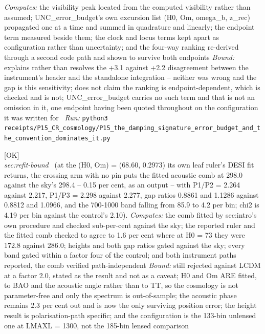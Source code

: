 \begin{description}
\emph{Computes:} the visibility peak located from the computed visibility rather than assumed; UNC\_error\_budget's own excursion list (H0, Om, omega\_b, z\_rec) propagated one at a time and summed in quadrature and linearly; the endpoint term measured beside them; the clock and locus terms kept apart as configuration rather than uncertainty; and the four-way ranking re-derived through a second code path and shown to survive both endpoints
 \emph{Bound:} explains rather than resolves the +3.1 against +2.2 disagreement between the instrument's header and the standalone integration -- neither was wrong and the gap is this sensitivity; does not claim the ranking is endpoint-dependent, which is checked and is not; UNC\_error\_budget carries no such term and that is not an omission in it, one endpoint having been quoted throughout on the configuration it was written for
\ \emph{Run:} \texttt{python3 receipts/P15\_CR\_cosmology/P15\_the\_damping\_signature\_error\_budget\_and\_the\_convention\_dominates\_it.py}
\item[\rcptlabel{P15_at_its_own_preferred_H0_the_crossing_arm_predicts_the_acoustic_comb_with_no_fitted_number}{P15R163}\textbf{P15R163}\quad\texttt{P15\_at\_its\_own\_preferred\_H0\_the\_crossing\_arm\_predicts\_the\_acoustic\_comb\_with\_no\_fitted\_number}]\hfill\textsf{[OK]}\\
\textit{sec:refit-bound} \ (at the (H0, Om) = (68.60, 0.2973) its own leaf ruler's DESI fit returns, the crossing arm with no pin puts the fitted acoustic comb at 298.0 against the sky's 298.4 -- 0.15 per cent, as an output -- with P1/P2 = 2.264 against 2.217, P1/P3 = 2.298 against 2.277, gap ratios 0.8861 and 1.1286 against 0.8812 and 1.0966, and the 700-1000 band falling from 85.9 to 4.2 per bin; chi2 is 4.19 per bin against the control's 2.10). 
\emph{Computes:} the comb fitted by sec:intro's own procedure and checked sub-per-cent against the sky; the reported ruler and the fitted comb checked to agree to 1.6 per cent where at H0 = 73 they were 172.8 against 286.0; heights and both gap ratios gated against the sky; every band gated within a factor four of the control; and both instrument paths reported, the comb verified path-independent
 \emph{Bound:} still rejected against LCDM at a factor 2.0, stated as the result and not as a caveat; H0 and Om ARE fitted, to BAO and the acoustic angle rather than to TT, so the cosmology is not parameter-free and only the spectrum is out-of-sample; the acoustic phase remains 2.3 per cent out and is now the only surviving position error; the height result is polarisation-path specific; and the configuration is the 133-bin unlensed one at LMAXL = 1300, not the 185-bin lensed comparison

\end{description}
